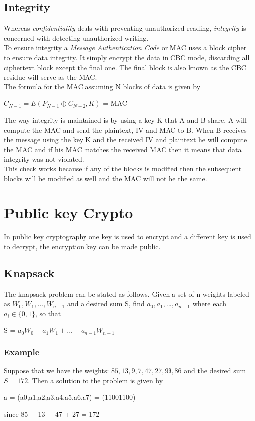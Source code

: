 \documentclass[a4paper]{article}
\begin{document}
\subsection{Integrity}
Whereas \textit{confidentiality} deals with preventing unauthorized reading, \textit{integrity} is concerned with detecting unauthorized writing.\\
To ensure integrity a \textit{Message Authentication Code} or MAC uses a block cipher to ensure data integrity. It simply encrypt the data in CBC mode, discarding all ciphertext block except the final one. The final block is also known as the CBC residue will serve as the MAC.\\
The formula for the MAC assuming N blocks of data is given by
\begin{center}
    $C_{N-1} = E(P_{N-1} \oplus C_{N-2},K)$ = MAC
\end{center}
The way integrity is maintained is by using a key K that A and B share, A will compute the MAC and send the plaintext, IV and MAC to B. When B receives the message using the key K and the received IV and plaintext he will compute the MAC and if his MAC matches the received MAC then it means that data integrity was not violated.\\
This check works because if any of the blocks is modified then the subsequent blocks will be modified as well and the MAC will not be the same.

\newpage
\section{Public key Crypto}
In public key cryptography one key is used to encrypt and a different key is used to decrypt, the encryption key can be made public.

\subsection{Knapsack}
The knapsack problem can be stated as follows. Given a set of n weights labeled as $W_0,W_1,...,W_{n-1}$ and a desired sum S, find $a_0,a_1,...,a_{n-1}$ where each $a_i \in \{0,1\}$, so that
\begin{center}
    S = $a_0W_0 + a_1W_1 + ... + a_{n-1}W_{n-1}$
\end{center}{}

\subsubsection{Example}
Suppose that we have the weights: $85,13,9,7,47,27,99,86$ and the desired sum $S = 172$. Then a solution to the problem is given by
\begin{center}
    a = (a0,a1,a2,a3,a4,a5,a6,a7) = (11001100)
\end{center}{}
since 85 + 13 + 47 + 27 = 172
\end{document}
